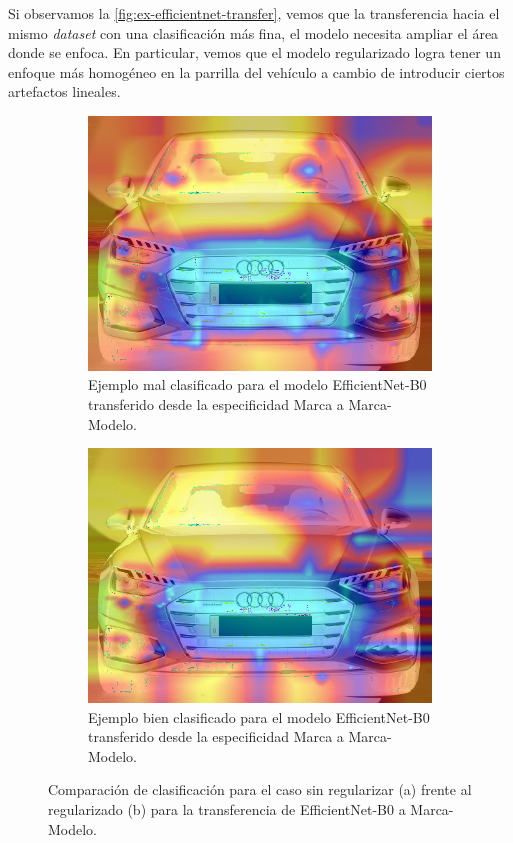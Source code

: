 Si observamos la \autoref{fig:ex-efficientnet-transfer}, vemos que la transferencia
hacia el mismo \textit{dataset} con una clasificación más fina, el modelo necesita
ampliar el área donde se enfoca. En particular, vemos que el modelo regularizado
logra tener un enfoque más homogéneo en la parrilla del vehículo a cambio de introducir
ciertos artefactos lineales.

\begin{figure}[H]
	\centering
	\begin{subfigure}
		{.45\textwidth}
		\centering
		\includegraphics[width=\linewidth]{img/154_false.png}
		\caption{Ejemplo mal clasificado para el modelo EfficientNet-B0 transferido
			desde la especificidad Marca a Marca-Modelo.}
		\label{fig:ex-efficientnet-transfer-1}
	\end{subfigure}%
	\qquad
	\begin{subfigure}
		{.45\textwidth}
		\centering
		\includegraphics[width=\linewidth]{img/154_true.png}
		\caption{Ejemplo bien clasificado para el modelo EfficientNet-B0 transferido
			desde la especificidad Marca a Marca-Modelo.}
		\label{fig:ex-efficientnet-transfer-2}
	\end{subfigure}
	\caption{Comparación de clasificación para el caso sin regularizar (a) frente
		al regularizado (b) para la transferencia de EfficientNet-B0 a Marca-Modelo.}
	\label{fig:ex-efficientnet-transfer}
\end{figure}

